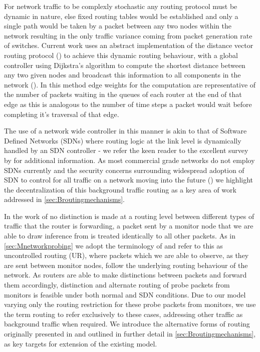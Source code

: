 For network traffic to be complexly stochastic any routing protocol must be dynamic in nature, else fixed routing tables would be established and only a single path would be taken by a packet between any two nodes within the network resulting in the only traffic variance coming from packet generation rate of switches. Current work uses an abstract implementation of the distance vector routing protocol (\cite{perkins_ad_2003}) to achieve this dynamic routing behaviour, with a global controller using Dijkstra's algorithm to compute the shortest distance between any two given nodes and broadcast this information to all components in the network (\cite{barnes_stochastic_2020}). In this method edge weights for the computation are representative of the number of packets waiting in the queues of each router at the end of that edge as this is analogous to the number of time steps a packet would wait before completing it’s traversal of that edge.\par
The use of a network wide controller in this manner is akin to that of Software Defined Networks (SDNs) where routing logic at the link level is dynamically handled by an SDN controller - we refer the keen reader to the excellent survey by \cite{kreutz_software-defined_2015} for additional information. As most commercial grade networks do not employ SDNs currently and the security concerns surrounding widespread adoption of SDN to control for all  traffic on a network moving into the future (\cite{wood_scalable_2021}) we highlight the decentralization of this background traffic routing as a key area of work addressed in \cref{sec:Broutingmechanisms}.\par
In the work of \cite{barnes_stochastic_2020} no distinction is made at a routing level between different types of traffic that the router is forwarding, a packet sent by a monitor node that we are able to draw inference from is treated identically to all other packets. As in \cref{sec:Mnetworkprobing} we adopt the terminology of \cite{he_network_2021} and refer to this as uncontrolled routing (UR), where packets which we are able to observe, as they are sent between monitor nodes, follow the underlying routing behaviour of the network. As routers are able to make distinctions between packets and forward them accordingly, distinction and alternate routing of probe packets from monitors is feasible under both normal and SDN conditions. Due to our model varying only the routing restriction for these probe packets from monitors, we use the term routing to refer exclusively to these cases, addressing other traffic as background traffic when required. We introduce the alternative forms of routing originally presented in \cite{he_network_2021} and outlined in further detail in \cref{sec:Broutingmechanisms}, as key targets for extension of the existing model.

